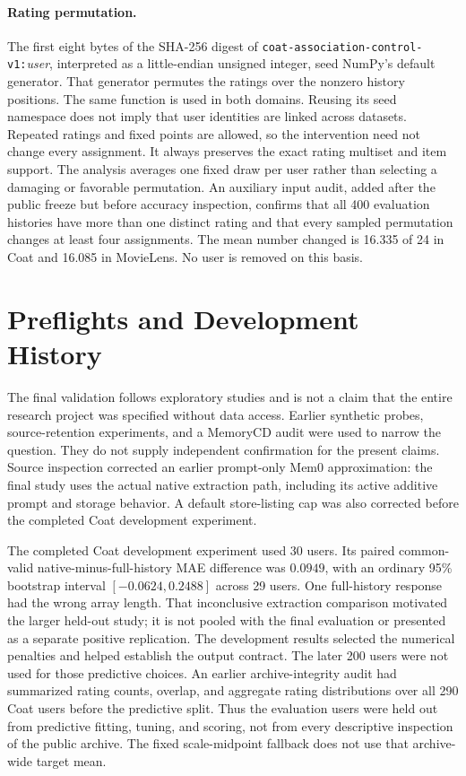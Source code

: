\paragraph{Rating permutation.} The first eight bytes of the SHA-256 digest of \texttt{coat-association-control-v1:}\emph{user}, interpreted as a little-endian unsigned integer, seed NumPy's default generator. That generator permutes the ratings over the nonzero history positions. The same function is used in both domains. Reusing its seed namespace does not imply that user identities are linked across datasets. Repeated ratings and fixed points are allowed, so the intervention need not change every assignment. It always preserves the exact rating multiset and item support. The analysis averages one fixed draw per user rather than selecting a damaging or favorable permutation. An auxiliary input audit, added after the public freeze but before accuracy inspection, confirms that all 400 evaluation histories have more than one distinct rating and that every sampled permutation changes at least four assignments. The mean number changed is 16.335 of 24 in Coat and 16.085 in MovieLens. No user is removed on this basis.

\section{Preflights and Development History}
\label{app:development}
The final validation follows exploratory studies and is not a claim that the entire research project was specified without data access. Earlier synthetic probes, source-retention experiments, and a MemoryCD audit were used to narrow the question. They do not supply independent confirmation for the present claims. Source inspection corrected an earlier prompt-only Mem0 approximation: the final study uses the actual native extraction path, including its active additive prompt and storage behavior. A default store-listing cap was also corrected before the completed Coat development experiment.

The completed Coat development experiment used 30 users. Its paired common-valid native-minus-full-history MAE difference was $0.0949$, with an ordinary 95\% bootstrap interval $[-0.0624,0.2488]$ across 29 users. One full-history response had the wrong array length. That inconclusive extraction comparison motivated the larger held-out study; it is not pooled with the final evaluation or presented as a separate positive replication. The development results selected the numerical penalties and helped establish the output contract. The later 200 users were not used for those predictive choices. An earlier archive-integrity audit had summarized rating counts, overlap, and aggregate rating distributions over all 290 Coat users before the predictive split. Thus the evaluation users were held out from predictive fitting, tuning, and scoring, not from every descriptive inspection of the public archive. The fixed scale-midpoint fallback does not use that archive-wide target mean.


